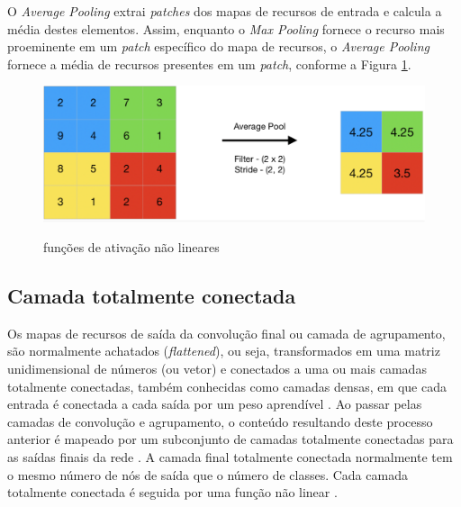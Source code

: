 \documentclass[
	12pt,				%
	oneside,			%
	a4paper,			%
	english,			%
	brazil				%
	]{abntex2ppgsi}
\begin{document}
O \textit{Average Pooling} extrai \textit{patches} dos mapas de recursos de entrada e calcula a média destes elementos. Assim, enquanto o \textit{Max Pooling} fornece o recurso mais proeminente em um \textit{patch} específico do mapa de recursos, o \textit{Average Pooling} fornece a média de recursos presentes em um \textit{patch}, conforme a Figura \ref{fig:average_pooling}.

\begin{figure}[H]
    \centering
    \caption{funções de ativação não lineares}
    \includegraphics[scale=.45]{imagens/conceitos_basicos/average_pooling.png}
    \label{fig:average_pooling}
\end{figure}

\subsection{Camada totalmente conectada}
Os mapas de recursos de saída da convolução final ou camada de agrupamento, são normalmente achatados (\textit{flattened}), ou seja, transformados em uma matriz unidimensional de números (ou vetor) e conectados a uma ou mais camadas totalmente conectadas, também conhecidas como camadas densas, em que cada entrada é conectada a cada saída por um peso aprendível \cite{yamashita2018convolutional}. Ao passar pelas camadas de convolução e agrupamento, o conteúdo resultando deste processo anterior é mapeado por um subconjunto de camadas totalmente conectadas para as saídas finais da rede \cite{yamashita2018convolutional}. A camada final totalmente conectada normalmente tem o mesmo número de nós de saída que o número de classes. Cada camada totalmente conectada é seguida por uma função não linear \cite{yamashita2018convolutional}.
\end{document}

